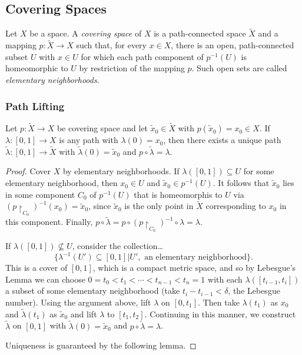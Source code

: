 \subsection{Covering Spaces}\label{coveringspaces}
Let $X$ be a space. A \emph{covering space} of $X$ is a path-connected space $\tilde X$ and a mapping $p: \tilde X \rightarrow X$
such that, for every $x \in X$, there is an open, path-connected subset $U$ with $x \in U$ for which each path component of $p^{-1}(U)$
is homeomorphic to $U$ by restriction of the mapping $p$. Such open sets are called \emph{elementary neighborhoods}\label{elementaryneighborhoods}.

\subsubsection{Path Lifting}\label{pathlifting}
\begin{lemma}
Let $p : \tilde X \rightarrow X$ be covering space and let $\tilde x_0 \in \tilde X$ with $p(\tilde x_0) = x_0 \in X$. If
$\lambda : [0,1] \rightarrow X$ is any path with $\lambda(0) = x_0$, then there exists a unique path $\tilde \lambda : [0,1] \rightarrow \tilde X$
with $\tilde \lambda (0) = \tilde x_0$ and $p \circ \tilde \lambda = \lambda$.
\end{lemma}

\begin{proof}
Cover $X$ by elementary neighborhoods. If $\lambda([0,1]) \subseteq U$ for some elementary neighborhood, then $x_0 \in U$ and $\tilde x_0 \in p^{-1}(U)$.
It follows that $\tilde x_0$ lies in some component $C_0$ of $p^{-1}(U)$ that is homeomorphis to $U$ via $(p \upharpoonright _{C_0})^{-1}(x_0) = \tilde x_0$,
since $\tilde x_0$ is the only point in $\tilde X$ corresponding to $x_0$ in this component. Finally, $p \circ \tilde \lambda = p \circ (p \upharpoonright _{C_0})^{-1} \circ \lambda = \lambda$.

If $\lambda([0,1]) \not \subseteq U$, consider the collection\dots
$$\{\lambda^{-1}(U') \subseteq [0,1] | U', \textrm{ an elementary neighborhood} \}.$$
This is a cover of $[0,1]$, which is a compact
metric space, and so by Lebesgue's Lemma we can choose $0 = t_0 < t_1 < \cdots < t_{n-1} < t_n = 1$ with each $\lambda([t_{i-1}, t_i])$ a subset of some elementary neighborhood (take $t_i - t_{i-1} < \delta$,
the Lebesgue number). Using the argument above, lift $\lambda$ on $[0,t_1]$. Then take $\lambda(t_1)$ as $x_0$ and $\tilde \lambda(t_1)$ as $\tilde x_0$ and lift $\lambda$ to $[t_1, t_2]$. Continuing in this
manner, we construct $\tilde \lambda$ on $[0,1]$ with $\tilde \lambda (0) = \tilde x_0$ and $p \circ \tilde \lambda = \lambda$.

Uniqueness is guaranteed by the following lemma.
\end{proof}

